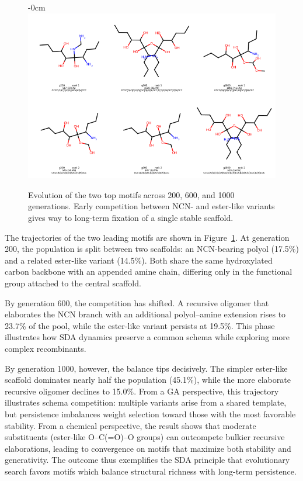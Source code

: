 \documentclass[life,article,submit,pdftex,moreauthors]{Definitions/mdpi}
\begin{document}
\begin{figure}[H]
    \begin{adjustwidth}{-\extralength}{0cm}
    \centering
    \includegraphics[width=1\textwidth]{SDA-chem-top-evo.png}
    \end{adjustwidth}
    \caption{Evolution of the two top motifs across 200, 600, and 1000 generations. Early competition between NCN- and ester-like variants gives way to long-term fixation of a single stable scaffold.}
    \label{fig:chem-top-evo}
\end{figure}

The trajectories of the two leading motifs are shown in Figure~\ref{fig:chem-top-evo}. At generation 200, the population is split between two scaffolds: an NCN-bearing polyol (17.5\%) and a related ester-like variant (14.5\%). Both share the same hydroxylated carbon backbone with an appended amine chain, differing only in the functional group attached to the central scaffold.  

By generation 600, the competition has shifted. A recursive oligomer that elaborates the NCN branch with an additional polyol–amine extension rises to 23.7\% of the pool, while the ester-like variant persists at 19.5\%. This phase illustrates how SDA dynamics preserve a common schema while exploring more complex recombinants.  

By generation 1000, however, the balance tips decisively. The simpler ester-like scaffold dominates nearly half the population (45.1\%), while the more elaborate recursive oligomer declines to 15.0\%. From a GA perspective, this trajectory illustrates schema competition: multiple variants arise from a shared template, but persistence imbalances weight selection toward those with the most favorable stability. From a chemical perspective, the result shows that moderate substituents (ester-like O–C(=O)–O groups) can outcompete bulkier recursive elaborations, leading to convergence on motifs that maximize both stability and generativity. The outcome thus exemplifies the SDA principle that evolutionary search favors motifs which balance structural richness with long-term persistence.
\end{document}
